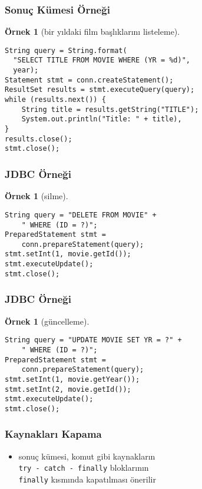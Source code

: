 \documentclass[dvipsnames]{beamer}
\theoremstyle{definition}
\theoremstyle{example}
\newtheorem{ornek}[theorem]{Örnek}
\theoremstyle{plain}
\begin{document}
\begin{frame}[fragile]
  \frametitle{Sonuç Kümesi Örneği}

  \begin{ornek}[bir yıldaki film başlıklarını listeleme]
    \begin{lstlisting}
String query = String.format(
  "SELECT TITLE FROM MOVIE WHERE (YR = %d)",
  year);
Statement stmt = conn.createStatement();
ResultSet results = stmt.executeQuery(query);
while (results.next()) {
    String title = results.getString("TITLE");
    System.out.println("Title: " + title),
}
results.close();
stmt.close();
    \end{lstlisting}
  \end{ornek}
\end{frame}

\begin{frame}[fragile]
  \frametitle{JDBC Örneği}

  \begin{ornek}[silme]
    \begin{lstlisting}
String query = "DELETE FROM MOVIE" +
    " WHERE (ID = ?)";
PreparedStatement stmt =
    conn.prepareStatement(query);
stmt.setInt(1, movie.getId());
stmt.executeUpdate();
stmt.close();
    \end{lstlisting}
  \end{ornek}
\end{frame}

\begin{frame}[fragile]
  \frametitle{JDBC Örneği}

  \begin{ornek}[güncelleme]
    \begin{lstlisting}
String query = "UPDATE MOVIE SET YR = ?" +
    " WHERE (ID = ?)";
PreparedStatement stmt =
    conn.prepareStatement(query);
stmt.setInt(1, movie.getYear());
stmt.setInt(2, movie.getId());
stmt.executeUpdate();
stmt.close();
    \end{lstlisting}
  \end{ornek}
\end{frame}

\begin{frame}
  \frametitle{Kaynakları Kapama}

  \begin{itemize}
    \item sonuç kümesi, komut gibi kaynakların\\
      \lstinline!try - catch - finally! bloklarının\\
      \lstinline!finally! kısmında kapatılması önerilir
  \end{itemize}
\end{frame}
\end{document}
